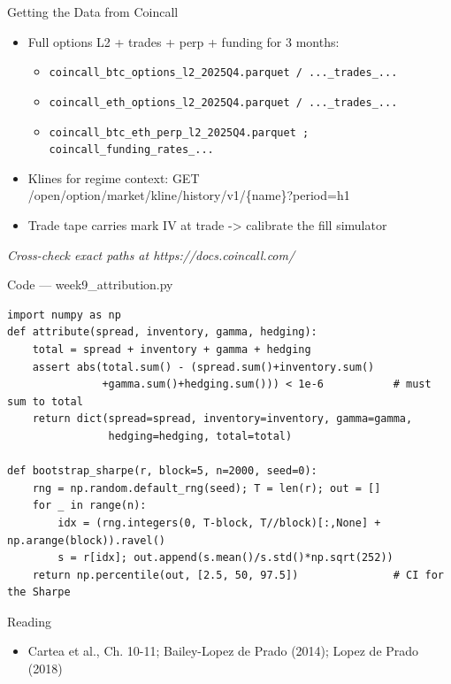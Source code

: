 \documentclass[aspectratio=169,10pt]{beamer}
\begin{document}
\begin{frame}{Getting the Data from Coincall}
\begin{itemize}
  \item Full options L2 + trades + perp + funding for 3 months:
  \begin{itemize}\item \texttt{\small coincall\_btc\_options\_l2\_2025Q4.parquet / ...\_trades\_...}\end{itemize}
  \begin{itemize}\item \texttt{\small coincall\_eth\_options\_l2\_2025Q4.parquet / ...\_trades\_...}\end{itemize}
  \begin{itemize}\item \texttt{\small coincall\_btc\_eth\_perp\_l2\_2025Q4.parquet ; coincall\_funding\_rates\_...}\end{itemize}
  \item Klines for regime context: GET /open/option/market/kline/history/v1/\{name\}?period=h1
  \item Trade tape carries mark IV at trade -\textgreater{} calibrate the fill simulator
\end{itemize}
\vspace{2pt}\tiny\textit{Cross-check exact paths at https://docs.coincall.com/}
\end{frame}

\begin{frame}[fragile]{Code --- week9\_attribution.py}
\begin{lstlisting}
import numpy as np
def attribute(spread, inventory, gamma, hedging):
    total = spread + inventory + gamma + hedging
    assert abs(total.sum() - (spread.sum()+inventory.sum()
               +gamma.sum()+hedging.sum())) < 1e-6           # must sum to total
    return dict(spread=spread, inventory=inventory, gamma=gamma,
                hedging=hedging, total=total)

def bootstrap_sharpe(r, block=5, n=2000, seed=0):
    rng = np.random.default_rng(seed); T = len(r); out = []
    for _ in range(n):
        idx = (rng.integers(0, T-block, T//block)[:,None] + np.arange(block)).ravel()
        s = r[idx]; out.append(s.mean()/s.std()*np.sqrt(252))
    return np.percentile(out, [2.5, 50, 97.5])               # CI for the Sharpe
\end{lstlisting}
\end{frame}
\begin{frame}{Reading}
\begin{itemize}
  \item Cartea et al., Ch. 10-11; Bailey-Lopez de Prado (2014); Lopez de Prado (2018)
\end{itemize}
\end{frame}
\end{document}

